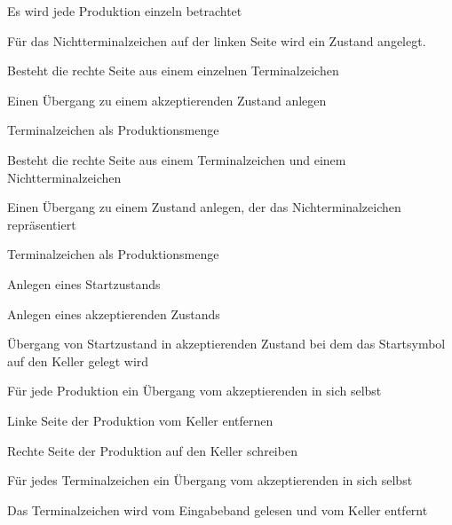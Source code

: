 {
    \begin{itemgroup}{}
	\item Es wird jede Produktion einzeln betrachtet
	\item Für das Nichtterminalzeichen auf der linken Seite wird ein Zustand
	angelegt.
	\item Besteht die rechte Seite aus einem einzelnen Terminalzeichen
  		\begin{itemgroup}{}
    	\item Einen Übergang zu einem akzeptierenden Zustand anlegen
    	\item Terminalzeichen als Produktionsmenge
    	\end{itemgroup}
	\item Besteht die rechte Seite aus einem Terminalzeichen und einem Nichtterminalzeichen
  		\begin{itemgroup}{}
    	\item Einen Übergang zu einem Zustand anlegen, der das Nichterminalzeichen
    	repräsentiert
		\item Terminalzeichen als Produktionsmenge
		 \end{itemgroup}
    \end{itemgroup}
	\vfill{}
}


{
    \begin{itemgroup}{}
	\item Anlegen eines Startzustands
	\item Anlegen eines akzeptierenden Zustands
	\item Übergang von Startzustand in akzeptierenden Zustand bei dem das 
	Startsymbol auf den Keller gelegt wird
	\item Für jede Produktion ein Übergang vom akzeptierenden in sich selbst
		\begin{itemgroup}{}
    	\item Linke Seite der Produktion vom Keller entfernen
    	\item Rechte Seite der Produktion auf den Keller schreiben
    	\end{itemgroup}
	\item Für jedes Terminalzeichen ein Übergang vom akzeptierenden in sich selbst
		\begin{itemgroup}{}
    	\item Das Terminalzeichen wird vom Eingabeband gelesen und vom Keller
    	entfernt \end{itemgroup}
	\end{itemgroup}
  
	\vfill{}
}


